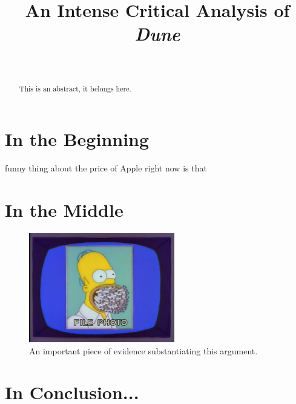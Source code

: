 \documentclass[10pt,journal,letterpaper,final]{IEEEtran}
\begin{document}
\title{An Intense Critical Analysis of \textit{Dune}}

\author{
	 \\
}

\maketitle

\begin{abstract}
This is an abstract, it belongs here. \lipsum[1]
\end{abstract}

\section{In the Beginning}

 funny thing about the price of Apple \cite{black-scholes} right now \cite{didion} is that \lipsum[2]

\section{In the Middle}

\lipsum[3]

\begin{figure}
\centering
\includegraphics[width=2.5in]{figure_1}
\caption{An important piece of evidence substantiating this argument.}
\label{figure_1}
\end{figure}

\section{In Conclusion...}

\lipsum[4]


\printbibliography

\end{document}
